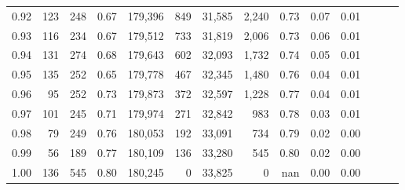 \begin{tabular}{rrrrrrrrrrrrrr}
0.92 &    123 &  248 &  0.67 &  179,396 &      849 &  31,585 &   2,240 &  0.73 &  0.07 &      0.01 \\
0.93 &    116 &  234 &  0.67 &  179,512 &      733 &  31,819 &   2,006 &  0.73 &  0.06 &      0.01 \\
0.94 &    131 &  274 &  0.68 &  179,643 &      602 &  32,093 &   1,732 &  0.74 &  0.05 &      0.01 \\
0.95 &    135 &  252 &  0.65 &  179,778 &      467 &  32,345 &   1,480 &  0.76 &  0.04 &      0.01 \\
0.96 &     95 &  252 &  0.73 &  179,873 &      372 &  32,597 &   1,228 &  0.77 &  0.04 &      0.01 \\
0.97 &    101 &  245 &  0.71 &  179,974 &      271 &  32,842 &     983 &  0.78 &  0.03 &      0.01 \\
0.98 &     79 &  249 &  0.76 &  180,053 &      192 &  33,091 &     734 &  0.79 &  0.02 &      0.00 \\
0.99 &     56 &  189 &  0.77 &  180,109 &      136 &  33,280 &     545 &  0.80 &  0.02 &      0.00 \\
1.00 &    136 &  545 &  0.80 &  180,245 &        0 &  33,825 &       0 &   nan &  0.00 &      0.00 \\
\bottomrule
\end{tabular}
